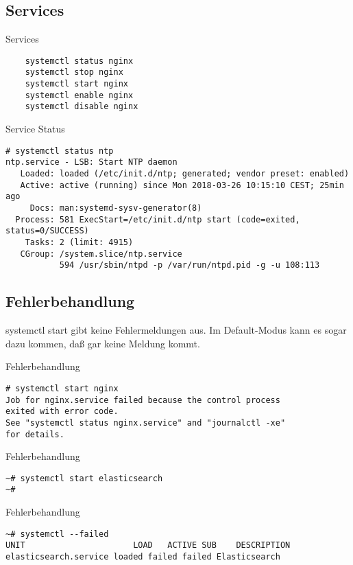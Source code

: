 \subsection{Services}

\begin{frame}[fragile]{Services}
 \begin{lstlisting}
    systemctl status nginx
    systemctl stop nginx
    systemctl start nginx
    systemctl enable nginx
    systemctl disable nginx
  \end{lstlisting}
\end{frame}

\begin{frame}[fragile]{Service Status}
\begin{lstlisting}
# systemctl status ntp
ntp.service - LSB: Start NTP daemon
   Loaded: loaded (/etc/init.d/ntp; generated; vendor preset: enabled)
   Active: active (running) since Mon 2018-03-26 10:15:10 CEST; 25min ago
     Docs: man:systemd-sysv-generator(8)
  Process: 581 ExecStart=/etc/init.d/ntp start (code=exited, status=0/SUCCESS)
    Tasks: 2 (limit: 4915)
   CGroup: /system.slice/ntp.service
           594 /usr/sbin/ntpd -p /var/run/ntpd.pid -g -u 108:113
\end{lstlisting}
\end{frame}

\subsection{Fehlerbehandlung}

systemctl start gibt keine Fehlermeldungen aus. Im Default-Modus kann es sogar dazu kommen, daß gar keine Meldung kommt.

\begin{frame}[fragile]{Fehlerbehandlung}
\begin{lstlisting}
# systemctl start nginx
Job for nginx.service failed because the control process
exited with error code.
See "systemctl status nginx.service" and "journalctl -xe" 
for details.
\end{lstlisting}
\end{frame}

\begin{frame}[fragile]{Fehlerbehandlung}
\begin{lstlisting}
~# systemctl start elasticsearch
~#
\end{lstlisting}
\end{frame}

\begin{frame}[fragile]{Fehlerbehandlung}
\begin{lstlisting}
~# systemctl --failed
UNIT                      LOAD   ACTIVE SUB    DESCRIPTION
elasticsearch.service loaded failed failed Elasticsearch
\end{lstlisting}
\end{frame}

